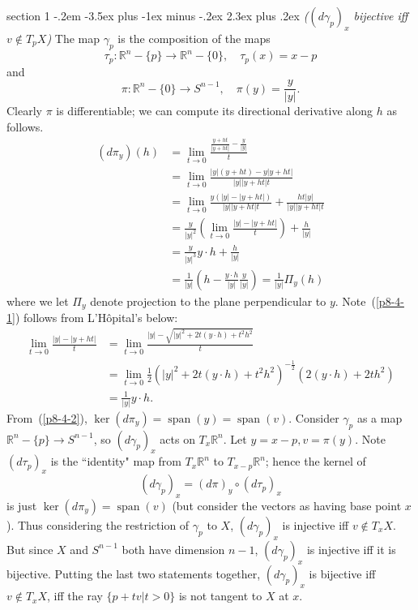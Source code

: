 \documentclass[12pt]{article}
\makeatletter
\theoremstyle{norm}
\newcommand{\R}[0]{\mathbb{R}}
\newcommand{\nin}[0]{\not\in}
\newcommand{\rc}[1]{\frac{1}{#1}}
\newcommand{\ga}[0]{\gamma}
\newcommand{\pa}[1]{\left( {#1} \right)}
\newcommand{\spn}{\operatorname{span}}
\newenvironment{problem}{\@startsection
       {section}
       {1}
       {-.2em}
       {-3.5ex plus -1ex minus -.2ex}
       {2.3ex plus .2ex}
       {\pagebreak[3]%
       \large\bf\noindent{Problem }
       }
       }
       {%
       }
\makeatother
\begin{document}
\begin{problem}{\it($(d\ga_p)_x$ bijective iff $v\nin T_pX$)}
The map $\ga_p$ is the composition of the maps
\[
\tau_p:\R^n-\{p\}\to \R^n-\{0\},\quad \tau_p(x)=x-p
\]
and
\[
\pi:\R^n-\{0\}\to S^{n-1},\quad \pi(y)=\frac{y}{|y|}.
\]
Clearly $\pi$ is differentiable; we can compute its directional derivative along $h$ as follows.
\begin{align}
\nonumber
(d\pi_y)(h)&=\lim_{t\to 0}\frac{\frac{y+ht}{|y+ht|}-\frac{y}{|y|}}{t}\\
\nonumber
&=\lim_{t\to 0} \frac{|y|(y+ht)-y|y+ht|}{|y||y+ht|t}\\
\nonumber
&=\lim_{t\to 0} \frac{y(|y|-|y+ht|)}{|y||y+ht|t}+\frac{ht|y|}{|y||y+ht|t}\\
\nonumber
&=\frac{y}{|y|^2}\pa{\lim_{t\to 0} \frac{|y|-|y+ht|}{t}}+\frac{h}{|y|}\\
\label{p8-4-1}
&=\frac{y}{|y|^3}y\cdot h+\frac{h}{|y|}\\
\label{p8-4-2}
&=\rc{|y|}\pa{h-\frac{y\cdot h}{|y|}\frac{y}{|y|}}=\rc{|y|}\Pi_y(h)
\end{align}
where we let $\Pi_y$ denote projection to the plane perpendicular to $y$.
Note~(\ref{p8-4-1}) follows from L'H\^{o}pital's below:
\begin{align*}
\lim_{t\to 0}\frac{|y|-|y+ht|}{t}&=\lim_{t\to 0} \frac{|y|-\sqrt{|y|^2+2t(y\cdot h)+t^2h^2}}{t}\\&=\lim_{t\to 0} \rc{2}(|y|^2+2t(y\cdot h)+t^2h^2)^{-\rc 2} (2(y\cdot h)+2th^2)\\
&=\rc{|y|}y\cdot h.
\end{align*}
From~(\ref{p8-4-2}), $\ker(d\pi_y)=\spn(y)=\spn(v)$. Consider $\ga_p$ as a map $\R^n-\{p\}\to S^{n-1}$, so $(d\ga_p)_x$ acts on $T_x\R^n$. Let $y=x-p,v=\pi(y)$. Note $(d\tau_p)_x$ is the ``identity" map from $T_x\R^n$ to $T_{x-p}\R^n$; hence the kernel of \[(d\ga_p)_{x}=(d\pi)_y\circ (d\tau_p)_x\] is just $\ker(d\pi_{y})=\spn(v)$ (but consider the vectors as having base point $x$). Thus considering the restriction of $\ga_p$ to $X$, $(d\ga_p)_x$ is injective iff $v\nin T_xX$. But since $X$ and $S^{n-1}$ both have dimension $n-1$, $(d\ga_p)_x$ is injective iff it is bijective. Putting the last two statements together, $(d\ga_p)_x$ is bijective iff $v\nin T_xX$, iff the ray $\{p+tv|t>0\}$ is not tangent to $X$ at $x$.
\end{problem}
\end{document}
